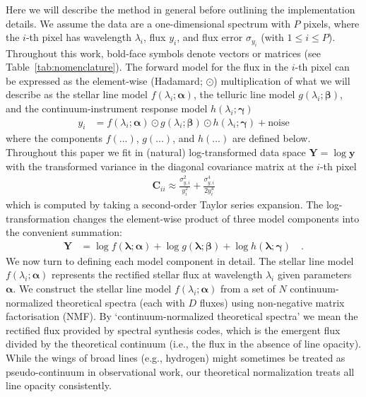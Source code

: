 \documentclass[modern,linenumbers]{aastex631}
\renewcommand{\vec}[1]{\mathbf{#1}}
\newcommand{\vecalpha}{\boldsymbol{\alpha}}
\newcommand{\vecbeta}{\boldsymbol{\beta}}
\newcommand{\vecgamma}{\boldsymbol{\gamma}}
\newcommand{\hadamard}{\odot}
\renewcommand{\added}[1]{#1}
\begin{document}

Here we will describe the method in general before outlining the implementation details. We assume the data are a one-dimensional spectrum with $P$ pixels, where the $i$-th pixel has wavelength $\lambda_i$, flux $y_i$, and flux error $\sigma_{y_i}$ (with $1 \leq i \leq P$). \added{Throughout this work, bold-face symbols denote vectors or matrices (see Table~\ref{tab:nomenclature}).} The forward model for the flux in the $i$-th pixel can be expressed as the element-wise (Hadamard; $\hadamard$) multiplication of what we will describe as the stellar line model $f(\lambda_i; \vecalpha)$, the telluric line model $g(\lambda_i; \vecbeta)$, and the continuum-instrument response model $h(\lambda_i;\vecgamma)$
\begin{align}\label{eq:y}
    y_i &= f(\lambda_i;\vecalpha)\hadamard{}g(\lambda_i;\vecbeta)\hadamard{}h(\lambda_i;\vecgamma) + \mbox{noise}
\end{align}
where the components $f(...)$, $g(...)$, and $h(...)$ are defined below. Throughout this paper we fit in (natural) log-transformed data space $\vec{Y} = \log{\vec{y}}$ with the transformed variance in the diagonal covariance matrix at the $i$-th pixel
\begin{eqnarray}
        \vec{C}_{ii} \approx \frac{\sigma_{y,i}^2}{y_i^2} + \frac{\sigma_{y,i}^4}{2y_i^4}
\end{eqnarray}
\noindent{}which is computed by taking a second-order Taylor series expansion. The log-transformation changes the element-wise product of three model components into the convenient summation:
\begin{align}
    \label{eq:log_y}
    \vec{Y} &= \log{f(\boldsymbol{\lambda}; \vecalpha)} + \log{g(\boldsymbol{\lambda};\vecbeta)} + \log{h(\boldsymbol{\lambda};\vecgamma)} \quad .
\end{align}
We now turn to defining each model component in detail.
The stellar line model $f(\lambda_i;\vecalpha)$ represents the rectified stellar flux at wavelength $\lambda_i$ given parameters $\vecalpha$. We construct the stellar line model $f(\lambda_i;\vecalpha)$ from a set of $N$ continuum-normalized theoretical spectra (each with $D$ fluxes) using non-negative matrix factorisation (NMF). \added{By `continuum-normalized theoretical spectra' we mean the rectified flux provided by spectral synthesis codes, which is the emergent flux divided by the theoretical continuum (i.e., the flux in the absence of line opacity). While the wings of broad lines (e.g., hydrogen) might sometimes be treated as pseudo-continuum in observational work, our theoretical normalization treats all line opacity consistently.}
\end{document}

